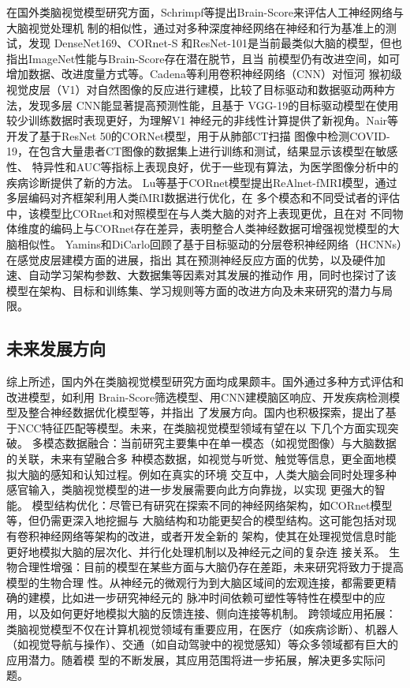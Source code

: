 在国外类脑视觉模型研究方面，Schrimpf等提出Brain-Score来评估人工神经网络与大脑视觉处理机
制的相似性，通过对多种深度神经网络在神经和行为基准上的测试，发现 DenseNet169、CORnet-S
和ResNet-101是当前最类似大脑的模型，但也指出ImageNet性能与Brain-Score存在潜在脱节，且当
前模型仍有改进空间，如可增加数据、改进度量方式等。Cadena等利用卷积神经网络（CNN）对恒河
猴初级视觉皮层（V1）对自然图像的反应进行建模，比较了目标驱动和数据驱动两种方法，发现多层
CNN能显著提高预测性能，且基于 VGG-19的目标驱动模型在使用较少训练数据时表现更好，为理解V1
神经元的非线性计算提供了新视角。Nair等开发了基于ResNet 50的CORNet模型，用于从肺部CT扫描
图像中检测COVID-19，在包含大量患者CT图像的数据集上进行训练和测试，结果显示该模型在敏感性、
特异性和AUC等指标上表现良好，优于一些现有算法，为医学图像分析中的疾病诊断提供了新的方法。
Lu等基于CORnet模型提出ReAlnet-fMRI模型，通过多层编码对齐框架利用人类fMRI数据进行优化，在
多个模态和不同受试者的评估中，该模型比CORnet和对照模型在与人类大脑的对齐上表现更优，且在对
不同物体维度的编码上与CORnet存在差异，表明整合人类神经数据可增强视觉模型的大脑相似性。
Yamins和DiCarlo回顾了基于目标驱动的分层卷积神经网络（HCNNs）在感觉皮层建模方面的进展，指出
其在预测神经反应方面的优势，以及硬件加速、自动学习架构参数、大数据集等因素对其发展的推动作
用，同时也探讨了该模型在架构、目标和训练集、学习规则等方面的改进方向及未来研究的潜力与局限。


\subsection{未来发展方向}

综上所述，国内外在类脑视觉模型研究方面均成果颇丰。国外通过多种方式评估和改进模型，如利用
Brain-Score筛选模型、用CNN建模脑区响应、开发疾病检测模型及整合神经数据优化模型等，并指出
了发展方向。国内也积极探索，提出了基于NCC特征匹配等模型。未来，在类脑视觉模型领域有望在以
下几个方面实现突破。
多模态数据融合：当前研究主要集中在单一模态（如视觉图像）与大脑数据的关联，未来有望融合多
种模态数据，如视觉与听觉、触觉等信息，更全面地模拟大脑的感知和认知过程。例如在真实的环境
交互中，人类大脑会同时处理多种感官输入，类脑视觉模型的进一步发展需要向此方向靠拢，以实现
更强大的智能。
模型结构优化：尽管已有研究在探索不同的神经网络架构，如CORnet模型等，但仍需更深入地挖掘与
大脑结构和功能更契合的模型结构。这可能包括对现有卷积神经网络等架构的改进，或者开发全新的
架构，使其在处理视觉信息时能更好地模拟大脑的层次化、并行化处理机制以及神经元之间的复杂连
接关系。
生物合理性增强：目前的模型在某些方面与大脑仍存在差距，未来研究将致力于提高模型的生物合理
性。从神经元的微观行为到大脑区域间的宏观连接，都需要更精确的建模，比如进一步研究神经元的
脉冲时间依赖可塑性等特性在模型中的应用，以及如何更好地模拟大脑的反馈连接、侧向连接等机制。
跨领域应用拓展：类脑视觉模型不仅在计算机视觉领域有重要应用，在医疗（如疾病诊断）、机器人
（如视觉导航与操作）、交通（如自动驾驶中的视觉感知）等众多领域都有巨大的应用潜力。随着模
型的不断发展，其应用范围将进一步拓展，解决更多实际问题。



